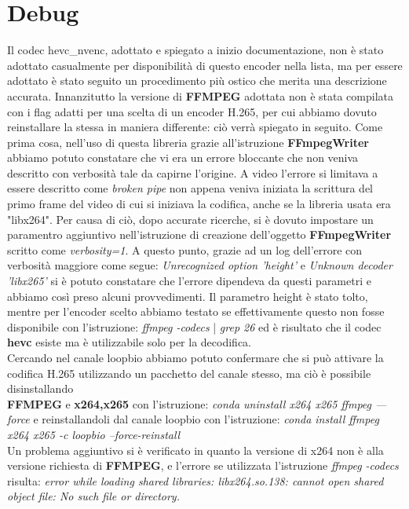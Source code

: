 \section{Debug}
\label{sec:debug}
Il codec hevc\_nvenc, adottato e spiegato a inizio documentazione, non è stato adottato casualmente per disponibilità di questo encoder nella lista, ma per essere adottato è stato seguito un procedimento più ostico che merita una descrizione accurata. 
Innanzitutto la versione di \textbf{FFMPEG} adottata non è stata compilata con i flag adatti per una scelta di un encoder H.265, per cui abbiamo dovuto reinstallare la stessa in maniera differente: ciò verrà spiegato in seguito. Come prima cosa, nell'uso di questa libreria grazie all'istruzione \textbf{FFmpegWriter} abbiamo potuto constatare che vi era un errore bloccante che non veniva descritto con verbosità tale da capirne l'origine. A video l'errore si limitava a essere descritto come \emph{broken pipe} non appena veniva iniziata la scrittura del primo frame del video di cui si iniziava la codifica, anche se la libreria usata era "libx264". Per causa di ciò, dopo accurate ricerche, si è dovuto impostare un paramentro aggiuntivo nell'istruzione di creazione dell'oggetto \textbf{FFmpegWriter} scritto come \emph{verbosity=1}. A questo punto, grazie ad un log dell'errore con verbosità maggiore come segue: \emph{Unrecognized option 'height’} e \emph{Unknown decoder 'libx265'} si è potuto constatare che l'errore dipendeva da questi parametri e abbiamo così preso alcuni provvedimenti. Il parametro height è stato tolto, mentre per l'encoder scelto abbiamo testato se effettivamente questo non fosse disponibile con l'istruzione: \emph{ffmpeg -codecs } | \emph{grep 26} ed è risultato che il codec \textbf{hevc} esiste ma è utilizzabile solo per la decodifica.\\
Cercando nel canale loopbio abbiamo potuto confermare che si può attivare la codifica H.265 utilizzando un pacchetto del canale stesso, ma ciò è possibile disinstallando\\ \textbf{FFMPEG} e \textbf{x264,x265} con l'istruzione:
\emph{conda uninstall x264 x265 ffmpeg —force} e reinstallandoli dal canale loopbio con l'istruzione: \emph{conda install ffmpeg x264 x265 -c loopbio --force-reinstall}\\
Un problema aggiuntivo si è verificato in quanto la versione di x264 non è alla versione richiesta di \textbf{FFMPEG}, e l'errore se utilizzata l'istruzione \emph{ffmpeg -codecs } risulta: \emph{error while loading shared libraries: libx264.so.138: cannot open shared object file: No such file or directory.}\\
